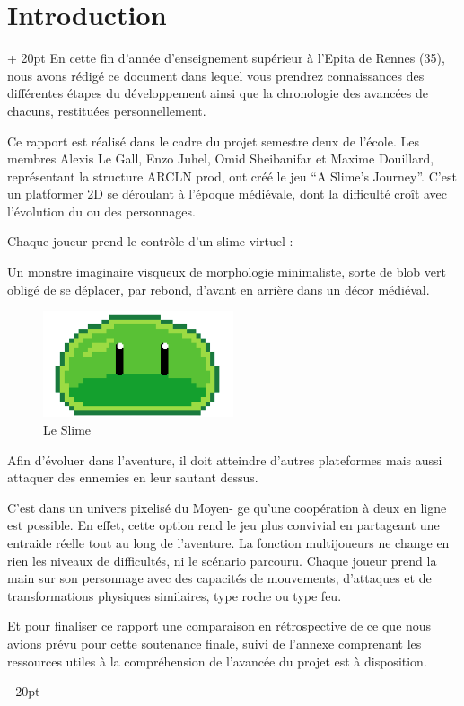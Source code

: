 \documentclass[a4paper, 12pt, twoside]{article}
\newcommand{\ind}[1][20pt]{\advance\leftskip + #1}
\newcommand{\deind}[1][20pt]{\advance\leftskip - #1}
\newenvironment{indt}[2][20pt]{#2 \par \ind[#1]}{\par \deind} %
\begin{document}
    

    \tableofcontents
    \newpage

    \begin{indt}{\section{Introduction}}
        En cette fin d’année d'enseignement supérieur à l’Epita de Rennes (35), nous avons rédigé ce document dans lequel vous prendrez connaissances des différentes étapes du développement ainsi que la chronologie des avancées de chacuns, restituées personnellement.

        Ce rapport est réalisé dans le cadre du projet semestre deux de l’école. Les membres Alexis Le Gall, Enzo Juhel, Omid Sheibanifar et Maxime Douillard, représentant la structure ARCLN prod, ont créé le jeu “A Slime’s Journey”. C’est un platformer 2D se déroulant à l’époque médiévale, dont la difficulté croît avec l’évolution du ou des personnages.

        Chaque joueur prend le contrôle d'un slime virtuel :

        Un monstre imaginaire visqueux de morphologie minimaliste, sorte de blob vert obligé de se déplacer, par rebond, d’avant en arrière dans un décor médiéval.

        \begin{figure}[h]
            \centering
            \includegraphics[width=0.5\textwidth]{logo.png}
            \caption{Le Slime}
            \label{fig:mesh1}
        \end{figure}

        Afin d’évoluer dans l’aventure, il doit atteindre d’autres plateformes mais aussi attaquer des ennemies en leur sautant dessus.

        C’est dans un univers pixelisé du Moyen- ge qu’une coopération à deux en ligne est possible. En effet, cette option rend le jeu plus convivial en partageant une entraide réelle tout au long de l’aventure.
        La fonction multijoueurs ne change en rien les niveaux de difficultés, ni le scénario parcouru.
        Chaque joueur prend la main sur son personnage avec des capacités de mouvements, d’attaques et de transformations physiques similaires, type roche ou type feu.

        Et pour finaliser ce rapport  une comparaison en rétrospective de ce que nous avions prévu pour cette soutenance finale, suivi de l’annexe comprenant les ressources utiles à la compréhension de l’avancée du projet est à disposition.
    \end{indt}
\end{document}
